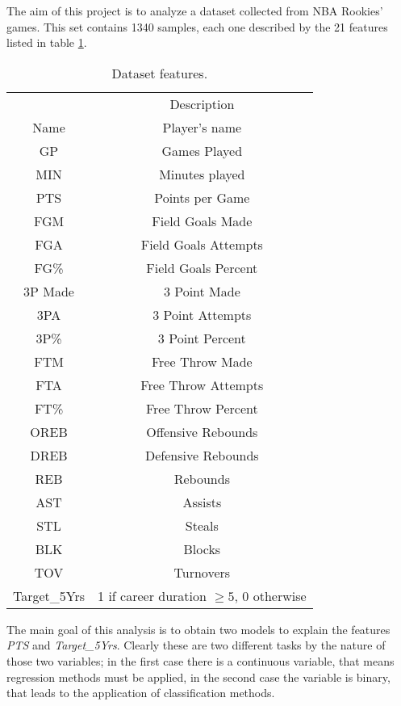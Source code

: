 The aim of this project is to analyze a dataset collected from NBA Rookies' games. This set contains 1340 samples, each one described by the 21 features listed in table \ref{tab:1}.
\begin{table}[h]
	\centering
	\begin{tabular}{||c | c ||} 
		\hline
		& Description\\
		Name & Player's name\\ 
		GP & Games Played\\ 
		MIN & Minutes played\\ 
		PTS & Points per Game\\
		FGM & Field Goals Made\\
		FGA & Field Goals Attempts\\
		FG\% & Field Goals Percent\\
		3P Made & 3 Point Made\\
		3PA & 3 Point Attempts\\
		3P\% & 3 Point Percent\\
		FTM & Free Throw Made\\
		FTA & Free Throw Attempts\\
		FT\% & Free Throw Percent\\
		OREB & Offensive Rebounds\\
		DREB & Defensive Rebounds\\
		REB & Rebounds\\
		AST & Assists\\
		STL & Steals\\
		BLK & Blocks\\
		TOV & Turnovers\\
		Target\_5Yrs & 1 if career duration $\geq 5$, 0 otherwise\\
		\hline
	\end{tabular}
	\caption{Dataset features.}
	\label{tab:1}
\end{table} 

The main goal of this analysis is to obtain two models to explain the features \textit{PTS} and \textit{Target\_5Yrs}. Clearly these are two different tasks by the nature of those two variables; in the first case there is a continuous variable, that means regression methods must be applied, in the second case the variable is binary, that leads to the application of classification methods.